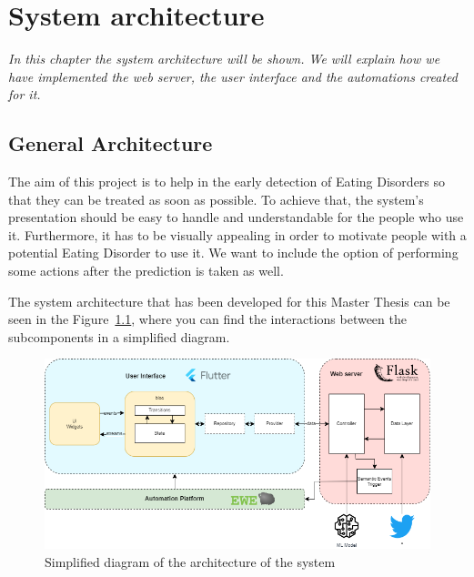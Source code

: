 \chapter{System architecture}
\label{chap:architecture}

\textit{In this chapter the system architecture will be shown. We will explain how we have implemented the web server, the user interface and the automations created for it.}

\clearpage

\section{General Architecture}


The aim of this project is to help in the early detection of Eating Disorders so that they can be treated as soon as possible. To achieve that, the system's presentation should be easy to handle and understandable for the people who use it. Furthermore, it has to be visually appealing in order to motivate people with a potential Eating Disorder to use it. We want to include the option of performing some actions after the prediction is taken as well.

The system architecture that has been developed for this Master Thesis can be seen in the Figure~\ref{fig:architecture}, where you can find the interactions between the subcomponents in a simplified diagram.

\begin{figure}[h]
    \centering
    \includegraphics[width=1.05\textwidth]{img/architecture/architecture.png}
    \caption{Simplified diagram of the architecture of the system}
    \label{fig:architecture}
\end{figure}



